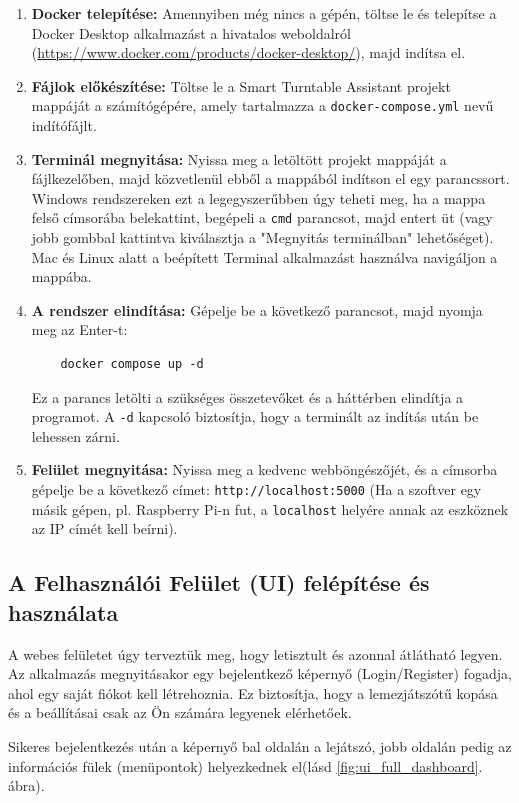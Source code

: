 \begin{enumerate}
    \item \textbf{Docker telepítése:} Amennyiben még nincs a gépén, töltse le és telepítse a Docker Desktop alkalmazást a hivatalos weboldalról (\url{https://www.docker.com/products/docker-desktop/}), majd indítsa el.
    \item \textbf{Fájlok előkészítése:} Töltse le a Smart Turntable Assistant projekt mappáját a számítógépére, amely tartalmazza a \texttt{docker-compose.yml} nevű indítófájlt.
    \item \textbf{Terminál megnyitása:} Nyissa meg a letöltött projekt mappáját a fájlkezelőben, majd közvetlenül ebből a mappából indítson el egy parancssort. Windows rendszereken ezt a legegyszerűbben úgy teheti meg, ha a mappa felső címsorába belekattint, begépeli a \texttt{cmd} parancsot, majd entert üt (vagy jobb gombbal kattintva kiválasztja a "Megnyitás terminálban" lehetőséget). Mac és Linux alatt a beépített Terminal alkalmazást használva navigáljon a mappába.
    \item \textbf{A rendszer elindítása:} Gépelje be a következő parancsot, majd nyomja meg az Enter-t:
    \begin{verbatim}
    docker compose up -d
    \end{verbatim}
    Ez a parancs letölti a szükséges összetevőket és a háttérben elindítja a programot. A \texttt{-d} kapcsoló biztosítja, hogy a terminált az indítás után be lehessen zárni.
    \item \textbf{Felület megnyitása:} Nyissa meg a kedvenc webböngészőjét, és a címsorba gépelje be a következő címet: \texttt{http://localhost:5000} (Ha a szoftver egy másik gépen, pl. Raspberry Pi-n fut, a \texttt{localhost} helyére annak az eszköznek az IP címét kell beírni).
\end{enumerate}

\subsection{A Felhasználói Felület (UI) felépítése és használata}
A webes felületet úgy terveztük meg, hogy letisztult és azonnal átlátható legyen. Az alkalmazás megnyitásakor egy bejelentkező képernyő (Login/Register) fogadja, ahol egy saját fiókot kell létrehoznia. Ez biztosítja, hogy a lemezjátszótű kopása és a beállításai csak az Ön számára legyenek elérhetőek.

Sikeres bejelentkezés után a képernyő bal oldalán a lejátszó, jobb oldalán pedig az információs fülek (menüpontok) helyezkednek el(lásd \ref{fig:ui_full_dashboard}. ábra).

